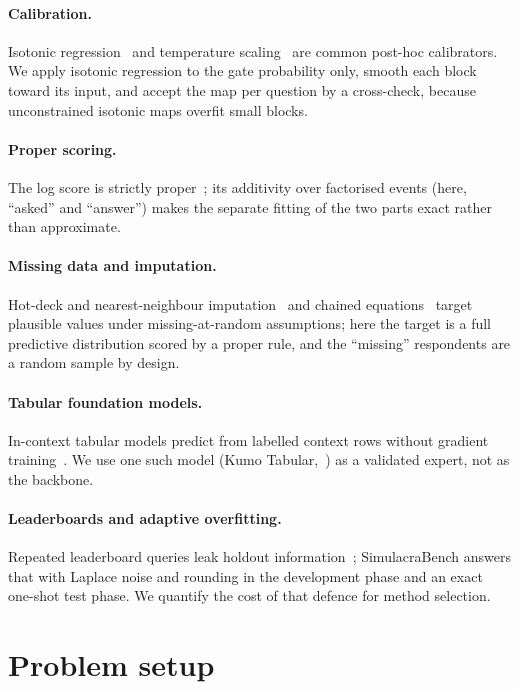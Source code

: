 \documentclass[10pt]{article}
\begin{document}
\paragraph{Calibration.} Isotonic regression~\citep{zadrozny2002transforming} and temperature scaling~\citep{guo2017calibration} are common post-hoc calibrators. We apply isotonic regression to the gate probability only, smooth each block toward its input, and accept the map per question by a cross-check, because unconstrained isotonic maps overfit small blocks.

\paragraph{Proper scoring.} The log score is strictly proper~\citep{gneiting2007strictly}; its additivity over factorised events (here, ``asked'' and ``answer'') makes the separate fitting of the two parts exact rather than approximate.

\paragraph{Missing data and imputation.} Hot-deck and nearest-neighbour imputation~\citep{andridge2010hotdeck} and chained equations~\citep{vanbuuren2011mice} target plausible values under missing-at-random assumptions; here the target is a full predictive distribution scored by a proper rule, and the ``missing'' respondents are a random sample by design.

\paragraph{Tabular foundation models.} In-context tabular models predict from labelled context rows without gradient training~\citep{hollmann2025tabpfn}. We use one such model (Kumo Tabular,~\citealp{kumo2026}) as a validated expert, not as the backbone.

\paragraph{Leaderboards and adaptive overfitting.} Repeated leaderboard queries leak holdout information~\citep{dwork2015reusable,blum2015ladder}; SimulacraBench answers that with Laplace noise and rounding in the development phase and an exact one-shot test phase. We quantify the cost of that defence for method selection.

\section{Problem setup}
\label{sec:setup}
\end{document}
